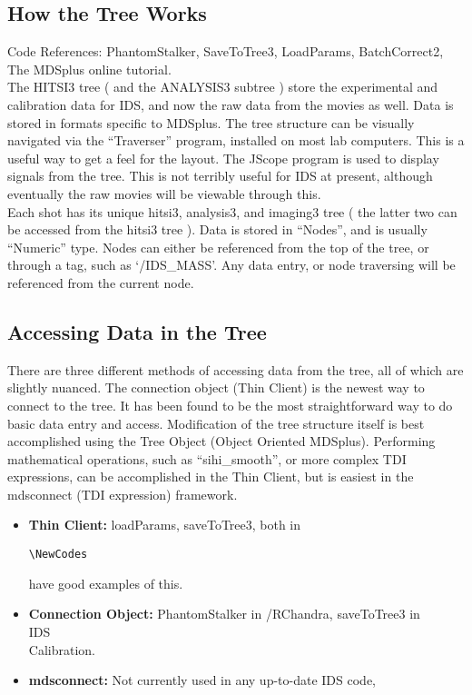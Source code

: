 \documentclass[twoside]{article}
\begin{document}
\subsection{How the Tree Works}
Code References: PhantomStalker, SaveToTree3, LoadParams, BatchCorrect2, The MDSplus online tutorial.\\
\hspace*{4ex}The HITSI3 tree ( and the ANALYSIS3 subtree ) store the experimental and calibration data for IDS, and now the raw data from the movies as well. Data is stored in formats specific to MDSplus. The tree structure can be visually navigated via the “Traverser” program, installed on most lab computers. This is a useful way to get a feel for the layout. The JScope program is used to display signals from the tree. This is not terribly useful for IDS at present, although eventually the raw movies will be viewable through this.\\
\hspace*{4ex}Each shot has its unique hitsi3, analysis3, and imaging3 tree ( the latter two can be accessed from the hitsi3 tree ). Data is stored in “Nodes”, and is usually “Numeric” type. Nodes can either be referenced from the top of the tree, or through a tag, such as ‘/IDS\_MASS’. Any data entry, or node traversing will be referenced from the current node. 
\subsection{Accessing Data in the Tree}
\hspace{4ex}There are three different methods of accessing data from the tree, all of which are slightly nuanced. The connection object (Thin Client) is the newest way to connect to the tree. It has been found to be the most straightforward way to do basic data entry and access. Modification of the tree structure itself is best accomplished using the Tree Object (Object Oriented MDSplus). Performing mathematical operations, such as “sihi\_smooth”, or more complex TDI expressions, can be accomplished in the Thin Client, but is easiest in the mdsconnect (TDI expression) framework. \\

\begin{itemize}
	\item\textbf{Thin Client:} loadParams, saveToTree3, both in \begin{verbatim}\NewCodes\end{verbatim} have good examples of this.
	\item\textbf{Connection Object:} PhantomStalker in /RChandra, saveToTree3 in \\IDS\\Calibration.
	\item\textbf{mdsconnect: }Not currently used in any up-to-date IDS code, 
\end{itemize}
\end{document}
